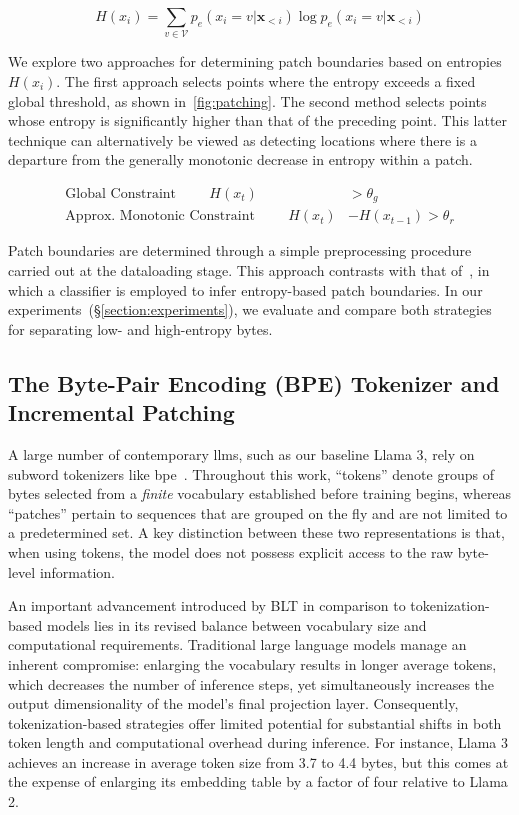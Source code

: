 \begin{equation}
H(x_i) = \sum_{v \in \mathcal{V}} p_{e}(x_i=v|\pmb{x}_{<i}) \log p_{e}(x_i=v|\pmb{x}_{<i})
\end{equation}

We explore two approaches for determining patch boundaries based on entropies $H(x_i)$. The first approach selects points where the entropy exceeds a fixed global threshold, as shown in~\autoref{fig:patching}. The second method selects points whose entropy is significantly higher than that of the preceding point. This latter technique can alternatively be viewed as detecting locations where there is a departure from the generally monotonic decrease in entropy within a patch.

\begin{align*}
    \text{Global Constraint}\hspace{1cm}H(x_t)& > \theta_g\\
    \text{Approx. Monotonic Constraint}\hspace{1cm}H(x_t)& - H(x_{t-1}) > \theta_r
\end{align*}

Patch boundaries are determined through a simple preprocessing procedure carried out at the dataloading stage. This approach contrasts with that of~\citet{nawrot-etal-2023-efficient}, in which a classifier is employed to infer entropy-based patch boundaries. In our experiments~(\S\ref{section:experiments}), we evaluate and compare both strategies for separating low- and high-entropy bytes.

\subsection{The Byte-Pair Encoding (BPE) Tokenizer and Incremental Patching}
\label{section:incremental-patching}
\label{section:bpe-patch}

A large number of contemporary llms, such as our baseline Llama 3, rely on subword tokenizers like bpe~\citep{gage1994new, sennrich-etal-2016-neural}. Throughout this work, ``tokens'' denote groups of bytes selected from a \textit{finite} vocabulary established before training begins, whereas ``patches'' pertain to sequences that are grouped on the fly and are not limited to a predetermined set. A key distinction between these two representations is that, when using tokens, the model does not possess explicit access to the raw byte-level information.

An important advancement introduced by {\textsc BLT} in comparison to tokenization-based models lies in its revised balance between vocabulary size and computational requirements. Traditional large language models manage an inherent compromise: enlarging the vocabulary results in longer average tokens, which decreases the number of inference steps, yet simultaneously increases the output dimensionality of the model's final projection layer. Consequently, tokenization-based strategies offer limited potential for substantial shifts in both token length and computational overhead during inference. For instance, Llama 3 achieves an increase in average token size from 3.7 to 4.4 bytes, but this comes at the expense of enlarging its embedding table by a factor of four relative to Llama 2.

